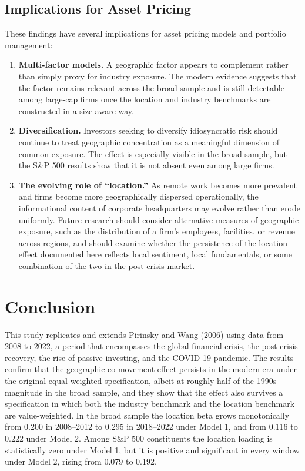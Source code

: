 \documentclass[
  12pt,
]{article}
\begin{document}
\subsection{Implications for Asset
Pricing}\label{implications-for-asset-pricing}

These findings have several implications for asset pricing models and
portfolio management:

\begin{enumerate}
\def\labelenumi{\arabic{enumi}.}
\item
  \textbf{Multi-factor models.} A geographic factor appears to
  complement rather than simply proxy for industry exposure. The modern
  evidence suggests that the factor remains relevant across the broad
  sample and is still detectable among large-cap firms once the location
  and industry benchmarks are constructed in a size-aware way.
\item
  \textbf{Diversification.} Investors seeking to diversify idiosyncratic
  risk should continue to treat geographic concentration as a meaningful
  dimension of common exposure. The effect is especially visible in the
  broad sample, but the S\&P 500 results show that it is not absent even
  among large firms.
\item
  \textbf{The evolving role of ``location.''} As remote work becomes
  more prevalent and firms become more geographically dispersed
  operationally, the informational content of corporate headquarters may
  evolve rather than erode uniformly. Future research should consider
  alternative measures of geographic exposure, such as the distribution
  of a firm's employees, facilities, or revenue across regions, and
  should examine whether the persistence of the location effect
  documented here reflects local sentiment, local fundamentals, or some
  combination of the two in the post-crisis market.
\end{enumerate}

\section{Conclusion}\label{conclusion}

This study replicates and extends Pirinsky and Wang (2006) using data
from 2008 to 2022, a period that encompasses the global financial
crisis, the post-crisis recovery, the rise of passive investing, and the
COVID-19 pandemic. The results confirm that the geographic co-movement
effect persists in the modern era under the original equal-weighted
specification, albeit at roughly half of the 1990s magnitude in the
broad sample, and they show that the effect also survives a
specification in which both the industry benchmark and the location
benchmark are value-weighted. In the broad sample the location beta
grows monotonically from 0.200 in 2008--2012 to 0.295 in 2018--2022
under Model 1, and from 0.116 to 0.222 under Model 2. Among S\&P 500
constituents the location loading is statistically zero under Model 1,
but it is positive and significant in every window under Model 2, rising
from 0.079 to 0.192.
\end{document}
